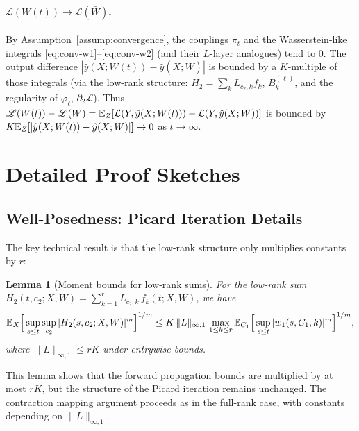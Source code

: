 \documentclass[nohyperref]{article}
\theoremstyle{plain}
\newtheorem{lemma}[theorem]{Lemma}
\theoremstyle{definition}
\theoremstyle{remark}
\begin{document}
\paragraph{$\mathscr{L}(W(t))\to\mathscr{L}(\bar W)$.}
By Assumption~\ref{assump:convergence}, the couplings $\pi_t$ and the Wasserstein-like integrals \eqref{eq:conv-w1}--\eqref{eq:conv-w2} (and their $L$-layer analogues) tend to 0. The output difference $|\hat{y}(X;W(t))-\hat{y}(X;\bar W)|$ is bounded by a $K$-multiple of those integrals (via the low-rank structure: $H_2=\sum_k L_{c_2,k}f_k$, $B_k^{(\ell)}$, and the regularity of $\varphi_\ell$, $\partial_2\mathcal{L}$). Thus $\mathscr{L}(W(t))-\mathscr{L}(\bar W)=\mathbb{E}_Z[\mathcal{L}(Y,\hat{y}(X;W(t)))-\mathcal{L}(Y,\hat{y}(X;\bar W))]$ is bounded by $K\mathbb{E}_Z[|\hat{y}(X;W(t))-\hat{y}(X;\bar W)|]\to 0$ as $t\to\infty$.





\section{Detailed Proof Sketches}
\label{app:proofs}


\subsection{Well-Posedness: Picard Iteration Details}
\label{app:picard}


The key technical result is that the low-rank structure only multiplies constants by $r$:

\begin{lemma}[Moment bounds for low-rank sums]
\label{lem:lowrank-moment}
For the low-rank sum $H_2(t,c_2;X,W)=\sum_{k=1}^r L_{c_2,k}\,f_k(t;X,W)$, we have
\[
\mathbb{E}_X\Big[\sup_{s\le t}\sup_{c_2}|H_2(s,c_2;X,W)|^m\Big]^{1/m}
\le K\,\|L\|_{\infty,1}\,\max_{1\le k\le r}\mathbb{E}_{C_1}\Big[\sup_{s\le t}|w_1(s,C_1,k)|^m\Big]^{1/m},
\]
where $\|L\|_{\infty,1}\le rK$ under entrywise bounds.
\end{lemma}

This lemma shows that the forward propagation bounds are multiplied by at most $rK$, but the structure of the Picard iteration remains unchanged. The contraction mapping argument proceeds as in the full-rank case, with constants depending on $\|L\|_{\infty,1}$.
\end{document}
